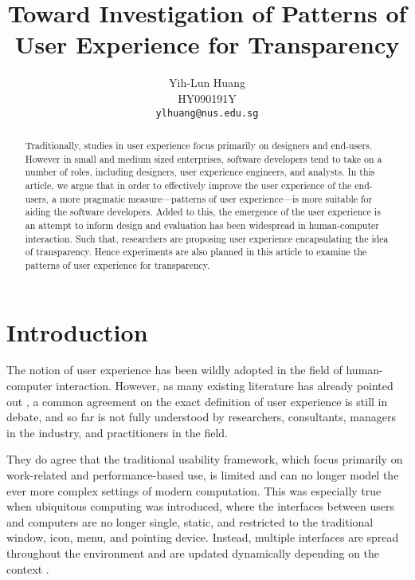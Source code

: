 \documentclass[a4paper,titlepage]{article}
\begin{document}
\title{Toward Investigation of Patterns of User Experience for
  Transparency}

\author{Yih-Lun Huang\\
HY090191Y\\
\texttt{ylhuang@nus.edu.sg}}

\maketitle


\begin{abstract}
Traditionally, studies in user experience focus primarily on designers
and end-users. However in small and medium sized enterprises, software
developers tend to take on a number of roles, including designers,
user experience engineers, and analysts. In this article, we argue
that in order to effectively improve the user experience of the
end-users, a more pragmatic measure---patterns of user experience---is
more suitable for aiding the software developers. Added to this, the
emergence of the user experience is an attempt to inform design and
evaluation has been widespread in human-computer interaction. Such
that, researchers are proposing user experience encapsulating the idea
of transparency. Hence experiments are also planned in this article to
examine the patterns of user experience for transparency.
\end{abstract}


\tableofcontents
\newpage


\section{Introduction}
\label{sec:introduction}
The notion of user experience has been wildly adopted in the field of
human-computer interaction. However, as many existing literature has
already pointed out \citep{ux:hassenzahl, ux:law}, a common agreement
on the exact definition of user experience is still in debate, and so
far is not fully understood by researchers, consultants, managers in
the industry, and practitioners in the field.

They do agree that the traditional usability framework, which focus
primarily on work-related and performance-based use, is limited and
can no longer model the ever more complex settings of modern
computation. This was especially true when ubiquitous computing was
introduced, where the interfaces between users and computers are no
longer single, static, and restricted to the traditional window, icon,
menu, and pointing device. Instead, multiple interfaces are spread
throughout the environment and are updated dynamically depending on
the context \citep{windows:bolter}.
\end{document}
